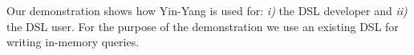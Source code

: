 \documentclass{llncs}
\newcommand{\tool}{Yin-Yang\xspace}
\begin{document}
  Our demonstration shows how \tool is used for: \emph{i)} the DSL developer and \emph{ii)} the DSL user. For the purpose of the demonstration we use an existing DSL for writing in-memory queries.











\end{document}
